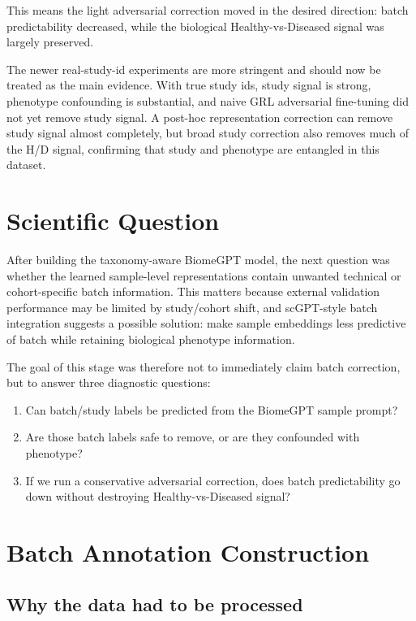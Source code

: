 \documentclass[11pt]{article}
\begin{document}
This means the light adversarial correction moved in the desired direction: batch
predictability decreased, while the biological Healthy-vs-Diseased signal was largely
preserved.

The newer real-study-id experiments are more stringent and should now be treated as the
main evidence. With true study ids, study signal is strong, phenotype confounding is
substantial, and naive GRL adversarial fine-tuning did not yet remove study signal. A
post-hoc representation correction can remove study signal almost completely, but broad
study correction also removes much of the H/D signal, confirming that study and phenotype
are entangled in this dataset.

\section{Scientific Question}

After building the taxonomy-aware BiomeGPT model, the next question was whether
the learned sample-level representations contain unwanted technical or cohort-specific
batch information. This matters because external validation performance may be limited
by study/cohort shift, and scGPT-style batch integration suggests a possible solution:
make sample embeddings less predictive of batch while retaining biological phenotype
information.

The goal of this stage was therefore not to immediately claim batch correction, but to
answer three diagnostic questions:

\begin{enumerate}
  \item Can batch/study labels be predicted from the BiomeGPT sample prompt?
  \item Are those batch labels safe to remove, or are they confounded with phenotype?
  \item If we run a conservative adversarial correction, does batch predictability go down
  without destroying Healthy-vs-Diseased signal?
\end{enumerate}

\section{Batch Annotation Construction}

\subsection{Why the data had to be processed}
\end{document}
